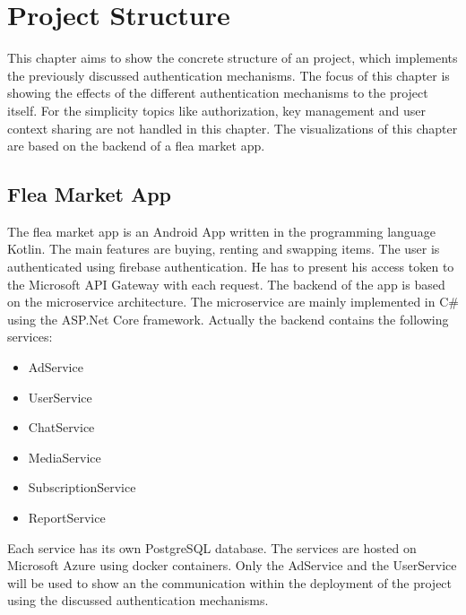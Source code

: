 \chapter{Project Structure}
\label{cha:project_structure}
This chapter aims to show the concrete structure of an project, which implements the previously discussed authentication mechanisms.
The focus of this chapter is showing the effects of the different authentication mechanisms to the project itself.
For the simplicity topics like authorization, key management and user context sharing are not handled in this chapter.
The visualizations of this chapter are based on the backend of a flea market app.

\section{Flea Market App}
The flea market app is an Android App written in the programming language Kotlin.
The main features are buying, renting and swapping items.
The user is authenticated using firebase authentication.
He has to present his access token to the Microsoft API Gateway with each request.
The backend of the app is based on the microservice architecture.
The microservice are mainly implemented in C\# using the ASP.Net Core framework.
Actually the backend contains the following services:
\begin{itemize}
	\item AdService
	\item UserService
	\item ChatService
	\item MediaService
	\item SubscriptionService
	\item ReportService
\end{itemize}
Each service has its own PostgreSQL database.
The services are hosted on Microsoft Azure using docker containers.
Only the AdService and the UserService will be used to show an the communication within the deployment of the project using the discussed authentication mechanisms.

